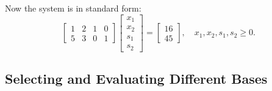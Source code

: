 Now the system is in standard form:
\[
\begin{bmatrix}
    1 & 2 & 1 & 0 \\
    5 & 3 & 0 & 1
\end{bmatrix}
\begin{bmatrix}
    x_1 \\ x_2 \\ s_1 \\ s_2
\end{bmatrix}
=
\begin{bmatrix}
    16 \\ 45
\end{bmatrix}, \quad x_1, x_2, s_1, s_2 \geq 0.
\]

\subsection{Selecting and Evaluating Different Bases}

